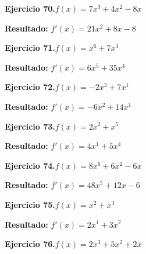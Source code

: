 \documentclass[10pt,a4paper]{article}
\begin{document}
\newpage
\begin{ejbox}
\textbf{Ejercicio 70.}\quad $f(x) = 7x^3 +4x^2 -8x$
\end{ejbox}

\begin{solbox}
\textbf{Resultado:} \(\displaystyle f'(x) = 21x^2 +8x -8\)
\end{solbox}

\begin{ejbox}
\textbf{Ejercicio 71.}\quad $f(x) = x^{6} + 7x^{3}$
\end{ejbox}

\begin{solbox}
\textbf{Resultado:} \(\displaystyle f'(x) = 6x^{5} + 35x^{4}\)
\end{solbox}

\begin{ejbox}
\textbf{Ejercicio 72.}\quad $f(x) = -2x^{3} + 7x^{1}$
\end{ejbox}

\begin{solbox}
\textbf{Resultado:} \(\displaystyle f'(x) = -6x^{2} + 14x^{1}\)
\end{solbox}

\newpage
\begin{ejbox}
\textbf{Ejercicio 73.}\quad $f(x) = 2x^{2} + x^{5}$
\end{ejbox}

\begin{solbox}
\textbf{Resultado:} \(\displaystyle f'(x) = 4x^{1} + 5x^{4}\)
\end{solbox}

\begin{ejbox}
\textbf{Ejercicio 74.}\quad $f(x) = 8x^{6} +6x^2 -6x$
\end{ejbox}

\begin{solbox}
\textbf{Resultado:} \(\displaystyle f'(x) = 48x^{5} +12x -6\)
\end{solbox}

\begin{ejbox}
\textbf{Ejercicio 75.}\quad $f(x) = x^{2} + x^{3}$
\end{ejbox}

\begin{solbox}
\textbf{Resultado:} \(\displaystyle f'(x) = 2x^{1} + 3x^{2}\)
\end{solbox}

\newpage
\begin{ejbox}
\textbf{Ejercicio 76.}\quad $f(x) = 2x^3 +5x^2 +2x$
\end{ejbox}
\end{document}
